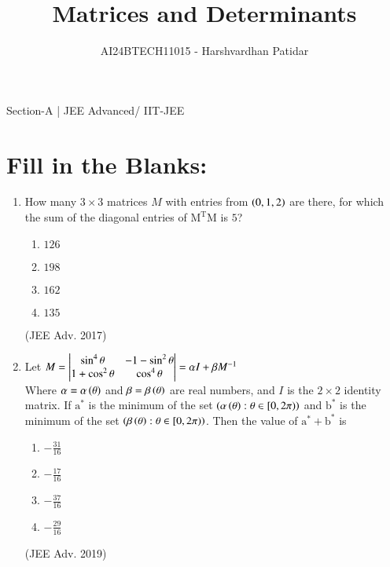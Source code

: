 \documentclass[journal,12pt,twocolumn]{IEEEtran}
\theoremstyle{remark}
\begin{document}

\vspace{3cm}

\title{Matrices and Determinants}
\author{AI24BTECH11015 - Harshvardhan Patidar}
\maketitle
\newpage
\bigskip

\renewcommand{\thefigure}{\theenumi}
\renewcommand{\thetable}{\theenumi}



Section-A | JEE Advanced/ IIT-JEE
 

		\section{Fill in the Blanks:}
			\begin{enumerate}
				\item
					How many $3 \times 3$ matrices $M$ with entries from $\left(0,1,2\right)$ are there, for which the sum of the diagonal entries of $\mathrm{M^TM}$ is $5$?
						\begin{enumerate}
							\item $126$
							\item $198$
							\item $162$
							\item $135$
						\end{enumerate}
						\hfill (JEE Adv. 2017)\\
				\item
					Let $M= \begin{vmatrix}
						\sin^4 \theta & -1 -\sin^2 \theta\\
						1+\cos^2 \theta & \cos^4 \theta
						\end{vmatrix} = 
						\alpha I + \beta M^{-1}$\\
					Where $\alpha = \alpha \left(\theta\right)$ and $\beta = \beta \left(\theta\right)$ are real numbers, and $I$ is the $2 \times 2$ identity matrix. If $\mathrm{a^*}$ is the minimum of the set $\left(\alpha \left(\theta\right) : \theta \in [0, 2 \pi)\right)$ and $\mathrm{b^*}$ is the minimum of the set $\left(\beta \left(\theta\right) : \theta \in [0, 2 \pi)\right)$. Then the value of $\mathrm{a^*} + \mathrm{b^*}$ is
						\begin{enumerate}
							\item $-\frac{31}{16}$
							\item $-\frac{17}{16}$
							\item $-\frac{37}{16}$
							\item $-\frac{29}{16}$
						\end{enumerate}
						\hfill (JEE Adv. 2019)\\
			\end{enumerate}
\end{document}
